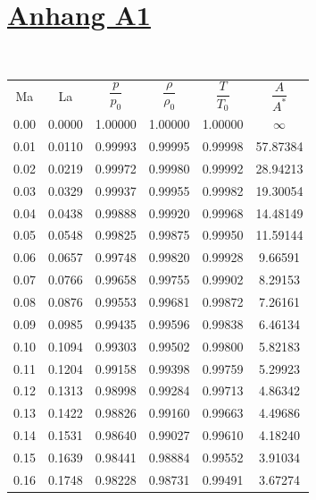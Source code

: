 \fancyfoot[C]{} %
\small

\section*{\underline{Anhang A1}}
\\ \vspace{4mm}%
\begin{minipage}{0.48\textwidth}
    \centering
    \begin{tabular}{c|c|c|c|c|c}
        Ma & La & $\dfrac{p}{p_0}$ & $\dfrac{\rho}{\rho_0}$ & $\dfrac{T}{T_0}$ & $\dfrac{A}{A^*}$ \\[2.2ex] \arrayrulecolor{Blue}\hline\arrayrulecolor{black}
        0.00 & 0.0000 & 1.00000 & 1.00000 & 1.00000 & $\infty$ \\
        0.01 & 0.0110 & 0.99993 & 0.99995 & 0.99998 & 57.87384 \\
        0.02 & 0.0219 & 0.99972 & 0.99980 & 0.99992 & 28.94213 \\
        0.03 & 0.0329 & 0.99937 & 0.99955 & 0.99982 & 19.30054 \\
        0.04 & 0.0438 & 0.99888 & 0.99920 & 0.99968 & 14.48149 \\
        0.05 & 0.0548 & 0.99825 & 0.99875 & 0.99950 & 11.59144 \\
        0.06 & 0.0657 & 0.99748 & 0.99820 & 0.99928 & 9.66591 \\
        0.07 & 0.0766 & 0.99658 & 0.99755 & 0.99902 & 8.29153 \\
        0.08 & 0.0876 & 0.99553 & 0.99681 & 0.99872 & 7.26161 \\
        0.09 & 0.0985 & 0.99435 & 0.99596 & 0.99838 & 6.46134 \\
        0.10 & 0.1094 & 0.99303 & 0.99502 & 0.99800 & 5.82183 \\
        0.11 & 0.1204 & 0.99158 & 0.99398 & 0.99759 & 5.29923 \\
        0.12 & 0.1313 & 0.98998 & 0.99284 & 0.99713 & 4.86342 \\
        0.13 & 0.1422 & 0.98826 & 0.99160 & 0.99663 & 4.49686 \\
        0.14 & 0.1531 & 0.98640 & 0.99027 & 0.99610 & 4.18240 \\
        0.15 & 0.1639 & 0.98441 & 0.98884 & 0.99552 & 3.91034 \\
        0.16 & 0.1748 & 0.98228 & 0.98731 & 0.99491 & 3.67274 \\

\end{tabular}
\end{minipage}
